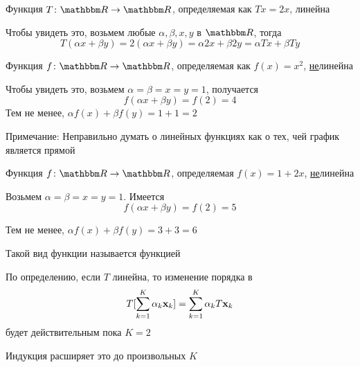 \begin{frame}

    \vspace{2em}
   \Eg Функция $T \colon \RR \to \RR$, определяемая как $Tx = 2x$, линейна 

    Чтобы увидеть это, возьмем любые $\alpha, \beta, x, y$ в $\RR$, тогда 
    \begin{equation*}
      T(\alpha x + \beta y)
      = 2(\alpha x + \beta y)
      = \alpha 2 x + \beta 2 y
      = \alpha Tx + \beta Ty  
    \end{equation*}

    \vspace{.7em}
    \Eg Функция $f \colon \RR \to \RR$, определяемая как $f(x) = x^2$, \underline{не}линейна
    
    Чтобы увидеть это, возьмем $\alpha = \beta = x = y = 1$, получается
    $$f(\alpha x + \beta y) = f(2) = 4$$
    Тем не менее, $\alpha f(x) + \beta f(y) = 1 + 1 = 2$
    
\end{frame}

\begin{frame}
    
    \vspace{2em}
    Примечание: Неправильно думать о линейных функциях как о тех, 
    чей график является прямой
    
    \vspace{.7em}
    \Eg    
    Функция $f \colon \RR \to \RR$, определяемая $f(x) = 1 + 2x$,
    \underline{не}линейна

    Возьмем $\alpha = \beta = x = y = 1$. Имеется
    $$f(\alpha x + \beta y) = f(2) = 5$$
    
    Тем не менее, $\alpha f(x) + \beta f(y) = 3 + 3 = 6$
   
    \vspace{.7em}
    
    Такой вид функции называется  функцией

\end{frame}

\begin{frame}

    \vspace{2em}
    По определению, если $T$ линейна, то изменение порядка в  
    \[T [ \sum_{k=1}^K \alpha_k {\mathbf x}_k ]
    = \sum_{k=1}^K \alpha_k T {\mathbf x}_k\]
    будет действительным пока $K=2$
    
    \vspace{.7em}
    Индукция расширяет это до произвольных $K$
    
\end{frame}

